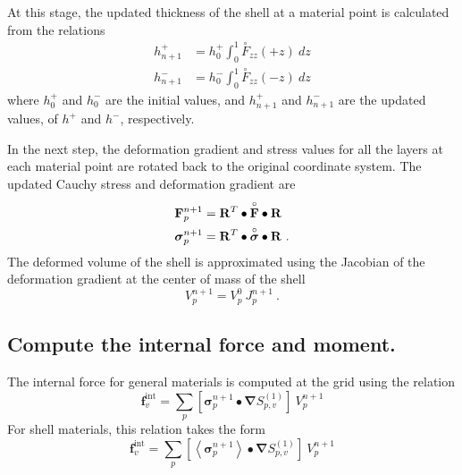       At this stage, the updated
      thickness of the shell at a material point is calculated from the 
      relations
      \begin{align}
        h^+_{n+1} &= h^+_0 \int^1_0 \overset{\circ}{F}_{zz}(+z)~dz \\
        h^-_{n+1} &= h^-_0 \int^1_0 \overset{\circ}{F}_{zz}(-z)~dz 
      \end{align}
      where $h^+_0$ and $h^-_0$ are the initial values, and $h^+_{n+1}$ and 
      $h^-_{n+1}$ are the updated values, of $h^+$ and $h^-$, respectively.

      In the next step, the deformation gradient and stress values
      for all the layers at each material point are rotated back to the
      original coordinate system.  The updated Cauchy stress and deformation
      gradient are
      \begin{align}
        \mathbf{F}_p^{n+1} & = \mathbf{R}^T\bullet
           \overset{\circ}{\mathbf{F}} \bullet\mathbf{R} \\
        \boldsymbol{\sigma}_p^{n+1} & = \mathbf{R}^T\bullet
           \overset{\circ}{\boldsymbol{\sigma}} \bullet\mathbf{R}~.
      \end{align}
      The deformed volume of the shell is approximated using the Jacobian of 
      the deformation gradient at the center of mass of the shell 
      \begin{equation}
         V_p^{n+1} = V_p^0~J_p^{n+1}~.
      \end{equation}
    \subsection{ Compute the internal force and moment.}
      The internal force for general materials is computed at the grid
      using the relation
      \begin{equation}
        \mathbf{f}_v^{\text{int}} = \sum_p \left[\boldsymbol{\sigma}_p^{n+1}
          \bullet \boldsymbol{\nabla}S^{(1)}_{p,v}\right]~V_{p}^{n+1}
      \end{equation}
      For shell materials, this relation takes the form
      \begin{equation}
        \mathbf{f}_v^{\text{int}} = \sum_p \left[\left<
          \boldsymbol{\sigma}_p^{n+1}\right>
          \bullet \boldsymbol{\nabla}S^{(1)}_{p,v}\right]~V_{p}^{n+1}
      \end{equation}
      
